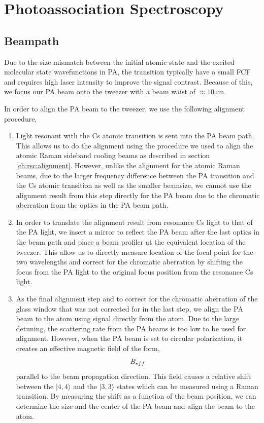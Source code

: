 \section{Photoassociation Spectroscopy}

\subsection{Beampath}


Due to the size mismatch between the initial atomic state and
the excited molecular state wavefunctions in PA,
the transition typically have a small FCF and
requires high laser intensity to improve the signal contrast.
Because of this, we focus our PA beam onto the tweezer with a beam waist of
$\approx10\mathrm{\mu m}$.

In order to align the PA beam to the tweezer, we use the following alignment procedure,

\begin{enumerate}
\item Light resonant with the Cs atomic transition is sent into the PA beam path.
  This allows us to do the alignment using the procedure we used to align the
  atomic Raman sideband cooling beams as described in section \ref{ch:rsc:alignment}.
  However, unlike the alignment for the atomic Raman beams,
  due to the larger frequency difference between the PA transition and the Cs atomic
  transition as well as the smaller beamsize,
  we cannot use the alignment result from this step directly for the PA beam
  due to the chromatic aberration from the optics in the PA beam path.
\item In order to translate the alignment result from resonance Cs light to that of the PA light,
  we insert a mirror to reflect the PA beam after the last optics in the beam path
  and place a beam profiler at the equivalent location of the tweezer.
  This allow us to directly measure location of the focal point for the two wavelengths
  and correct for the chromatic aberration by shifting the focus from the PA light
  to the original focus position from the resonance Cs light.
\item As the final alignment step and to correct for the chromatic aberration of the
  glass window that was not corrected for in the last step,
  we align the PA beam to the atom using signal directly from the atom.
  Due to the large detuning, the scattering rate from the PA beams
  is too low to be used for alignment.
  However, when the PA beam is set to circular polarization, it creates an effective
  magnetic field of the form,
  \[ B_{eff}\todo{equation} \]
  parallel to the beam propagation direction.
  This field causes a relative shift between the $|4,4\rangle$
  and the $|3,3\rangle$ states which can be measured using a Raman transition.
  By measuring the shift as a function of the beam position,
  we can determine the size and the center of the PA beam and align the beam to the atom.
\end{enumerate}

